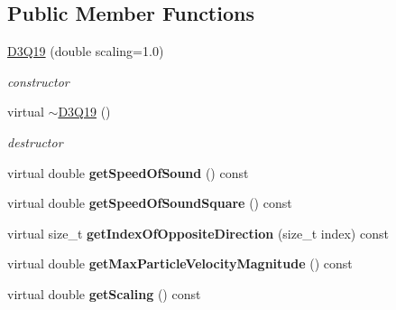 \subsection*{Public Member Functions}
\begin{DoxyCompactItemize}
\item 
\hypertarget{classnatrium_1_1D3Q19_af5ebed1fc34e3496fdb02eedcb379357}{
\hyperlink{classnatrium_1_1D3Q19_af5ebed1fc34e3496fdb02eedcb379357}{D3Q19} (double scaling=1.0)}
\label{classnatrium_1_1D3Q19_af5ebed1fc34e3496fdb02eedcb379357}

\begin{DoxyCompactList}\small\item\em constructor \item\end{DoxyCompactList}\item 
\hypertarget{classnatrium_1_1D3Q19_a9ee5b7b88195b0757472b6179186474e}{
virtual \hyperlink{classnatrium_1_1D3Q19_a9ee5b7b88195b0757472b6179186474e}{$\sim$D3Q19} ()}
\label{classnatrium_1_1D3Q19_a9ee5b7b88195b0757472b6179186474e}

\begin{DoxyCompactList}\small\item\em destructor \item\end{DoxyCompactList}\item 
\hypertarget{classnatrium_1_1D3Q19_af2580d30fd2d3570db5bdf19b1f8bf44}{
virtual double {\bfseries getSpeedOfSound} () const }
\label{classnatrium_1_1D3Q19_af2580d30fd2d3570db5bdf19b1f8bf44}

\item 
\hypertarget{classnatrium_1_1D3Q19_aa57a051bfef2bd1253b59077f15daab7}{
virtual double {\bfseries getSpeedOfSoundSquare} () const }
\label{classnatrium_1_1D3Q19_aa57a051bfef2bd1253b59077f15daab7}

\item 
\hypertarget{classnatrium_1_1D3Q19_a0ba17a57d531a2ff80468d014a59b071}{
virtual size\_\-t {\bfseries getIndexOfOppositeDirection} (size\_\-t index) const }
\label{classnatrium_1_1D3Q19_a0ba17a57d531a2ff80468d014a59b071}

\item 
\hypertarget{classnatrium_1_1D3Q19_ace8b31d69b10b748f4951744425a8177}{
virtual double {\bfseries getMaxParticleVelocityMagnitude} () const }
\label{classnatrium_1_1D3Q19_ace8b31d69b10b748f4951744425a8177}

\item 
\hypertarget{classnatrium_1_1D3Q19_a5ae0a8c8d01e0613e22695d11446c64e}{
virtual double {\bfseries getScaling} () const }
\label{classnatrium_1_1D3Q19_a5ae0a8c8d01e0613e22695d11446c64e}

\end{DoxyCompactItemize}
